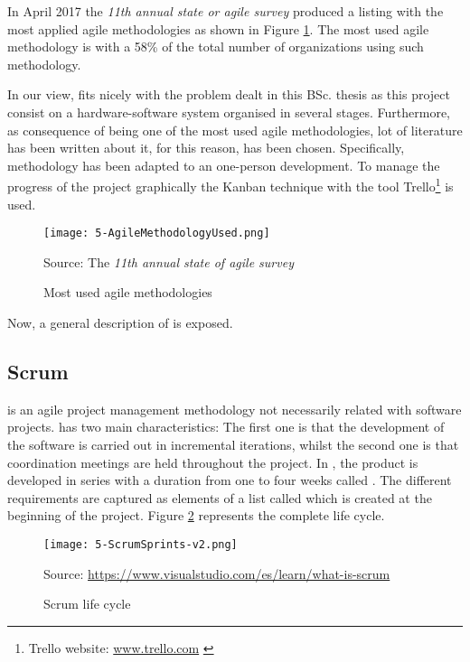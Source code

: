 In April 2017 the \emph{11th annual state or agile survey} \cite{AnualStateAgile} produced a listing with the most applied agile methodologies as shown in Figure \ref{fig:5-AgileMethodologyUsed}. The most used agile methodology is  with a 58\% of the total number of organizations using such methodology.

In our view,  fits nicely with the problem dealt in this \ac{BSc.} thesis as this project consist on a hardware-software system organised in several stages. Furthermore, as consequence of being one of the most used agile methodologies, lot of literature has been written about it, for this reason,  has been chosen. Specifically,  methodology \cite{ScrumGuide} has been adapted to an one-person development. To manage the progress of the project graphically the Kanban technique with the tool Trello\footnote{Trello website: \url{www.trello.com} \label{footnote-1}} is used.

\begin{figure}[!h]
	\begin{center}
		\texttt{[image: 5-AgileMethodologyUsed.png]}
		\caption{Most used agile methodologies}{Source: The \emph{11th annual state of agile survey}}
		\label{fig:5-AgileMethodologyUsed}
	\end{center}
\end{figure}

Now, a general description of  is exposed.


\subsection{Scrum}
 \cite{ScrumGuide} is an agile project management methodology not necessarily related with software projects.  has two main characteristics: The first one is that the development of the software is carried out in incremental iterations, whilst the second one is that coordination meetings are held throughout the project.
In , the product is developed in series with a duration from one to four weeks called . The different requirements are captured as elements of a list called  which is created at the beginning of the project. Figure \ref{fig:5-ScrumSprints} represents the complete  life cycle.

\begin{figure}[!h]
	\begin{center}
		\texttt{[image: 5-ScrumSprints-v2.png]}	
		\caption{Scrum life cycle}{Source: \url{https://www.visualstudio.com/es/learn/what-is-scrum}}
		\label{fig:5-ScrumSprints}
	\end{center}
\end{figure}


